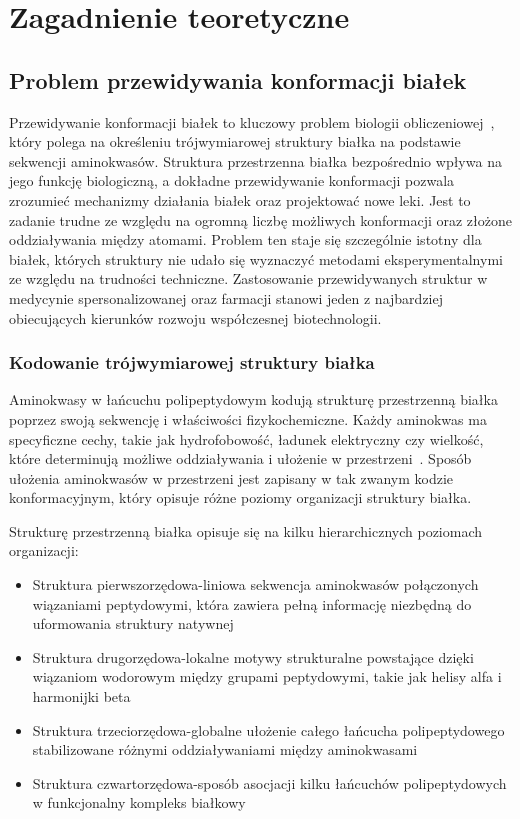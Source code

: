 \chapter{Zagadnienie teoretyczne}


\section{Problem przewidywania konformacji białek}
Przewidywanie konformacji białek to kluczowy problem biologii obliczeniowej~\cite{alphafold3}, który polega na określeniu trójwymiarowej struktury białka na podstawie sekwencji aminokwasów.
Struktura przestrzenna białka bezpośrednio wpływa na jego funkcję biologiczną, a dokładne przewidywanie konformacji pozwala zrozumieć mechanizmy działania białek oraz projektować nowe leki.
Jest to zadanie trudne ze względu na ogromną liczbę możliwych konformacji oraz złożone oddziaływania między atomami.
Problem ten staje się szczególnie istotny dla białek, których struktury nie udało się wyznaczyć metodami eksperymentalnymi ze względu na trudności techniczne.
Zastosowanie przewidywanych struktur w medycynie spersonalizowanej oraz farmacji stanowi jeden z najbardziej obiecujących kierunków rozwoju współczesnej biotechnologii.

\subsection{Kodowanie trójwymiarowej struktury białka}
Aminokwasy w łańcuchu polipeptydowym kodują strukturę przestrzenną białka poprzez swoją sekwencję i właściwości fizykochemiczne.
Każdy aminokwas ma specyficzne cechy, takie jak hydrofobowość, ładunek elektryczny czy wielkość, które determinują możliwe oddziaływania i ułożenie w przestrzeni~\cite{protein_folding}.
Sposób ułożenia aminokwasów w przestrzeni jest zapisany w tak zwanym kodzie konformacyjnym, który opisuje różne poziomy organizacji struktury białka.

Strukturę przestrzenną białka opisuje się na kilku hierarchicznych poziomach organizacji:

\begin{itemize}
    \item Struktura pierwszorzędowa-liniowa sekwencja aminokwasów połączonych wiązaniami peptydowymi, która zawiera pełną informację niezbędną do uformowania struktury natywnej
    \item Struktura drugorzędowa-lokalne motywy strukturalne powstające dzięki wiązaniom wodorowym między grupami peptydowymi, takie jak helisy alfa i harmonijki beta
    \item Struktura trzeciorzędowa-globalne ułożenie całego łańcucha polipeptydowego stabilizowane różnymi oddziaływaniami między aminokwasami
    \item Struktura czwartorzędowa-sposób asocjacji kilku łańcuchów polipeptydowych w funkcjonalny kompleks białkowy
\end{itemize}


